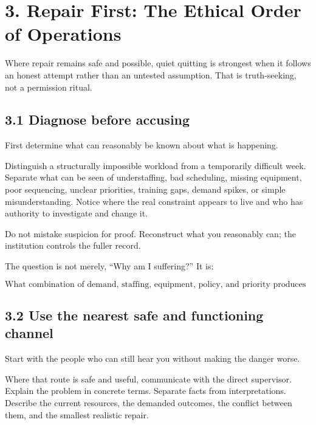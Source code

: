 \documentclass[11pt,oneside]{article}
\begin{document}
\hypertarget{repair-first-the-ethical-order-of-operations}{%
\section{3. Repair First: The Ethical Order of
Operations}\label{repair-first-the-ethical-order-of-operations}}

Where repair remains safe and possible, quiet quitting is strongest when
it follows an honest attempt rather than an untested assumption. That is
truth-seeking, not a permission ritual.

\hypertarget{diagnose-before-accusing}{%
\subsection{3.1 Diagnose before
accusing}\label{diagnose-before-accusing}}

First determine what can reasonably be known about what is happening.

Distinguish a structurally impossible workload from a temporarily
difficult week. Separate what can be seen of understaffing, bad
scheduling, missing equipment, poor sequencing, unclear priorities,
training gaps, demand spikes, or simple misunderstanding. Notice where
the real constraint appears to live and who has authority to investigate
and change it.

Do not mistake suspicion for proof. Reconstruct what you reasonably can;
the institution controls the fuller record.

The question is not merely, ``Why am I suffering?'' It is:

\[
\text{What combination of demand, staffing, equipment, policy, and priority produces this outcome?}
\]

\hypertarget{use-the-nearest-safe-and-functioning-channel}{%
\subsection{3.2 Use the nearest safe and functioning
channel}\label{use-the-nearest-safe-and-functioning-channel}}

Start with the people who can still hear you without making the danger
worse.

Where that route is safe and useful, communicate with the direct
supervisor. Explain the problem in concrete terms. Separate facts from
interpretations. Describe the current resources, the demanded outcomes,
the conflict between them, and the smallest realistic repair.
\end{document}
